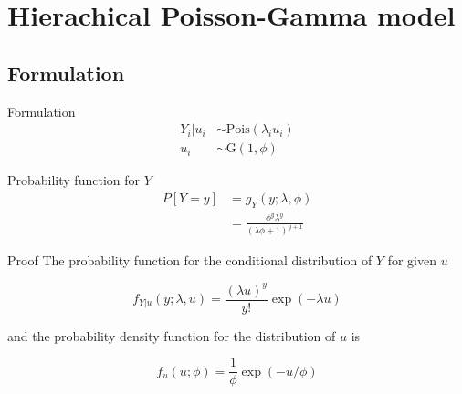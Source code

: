 \documentclass[aspectratio=169]{beamer}
\begin{document}
\hypertarget{hierachical-poisson-gamma-model}{%
\section{Hierachical Poisson-Gamma
model}\label{hierachical-poisson-gamma-model}}

\hypertarget{formulation}{%
\subsection{Formulation}\label{formulation}}

\begin{frame}{Formulation}
\begin{subequations} \label{eq:PoisGam}
  \begin{alignat}{2}
    Y_{i}|u_{i} &\sim \mathrm{Pois} (\lambda_{i} u_{i}) \label{eq:pois_g0} \\ 
    u_{i} &\sim \mathrm{G}(1,\phi) \label{eq:pois_g1}
  \end{alignat}
\end{subequations}
\end{frame}

\begin{frame}{Probability function for \(Y\)}
\protect\hypertarget{probability-function-for-y}{}
\begin{equation} \label{eq:pdfMix}
  \begin{aligned}
    P[Y=y]&=g_{Y}(y;\lambda, \phi) \\
    &=\frac{\phi^{y}\lambda^{y}}{(\lambda \phi + 1)^{y+1}} 
  \end{aligned}
\end{equation}
\end{frame}

\begin{frame}{Proof}
\protect\hypertarget{proof}{}
The probability function for the conditional distribution of \(Y\) for
given \(u\)

\begin{equation} \label{eq:pdfPois}
  f_{Y|u}(y;\lambda, u)=\frac{(\lambda u)^y}{y!} \exp (-\lambda u)
\end{equation}

and the probability density function for the distribution of \(u\) is

\begin{equation} \label{eq:pdfGamma}
  f_{u}(u;\phi)=\frac{1}{\phi} \exp (-u/\phi)
\end{equation}
\end{frame}
\end{document}
